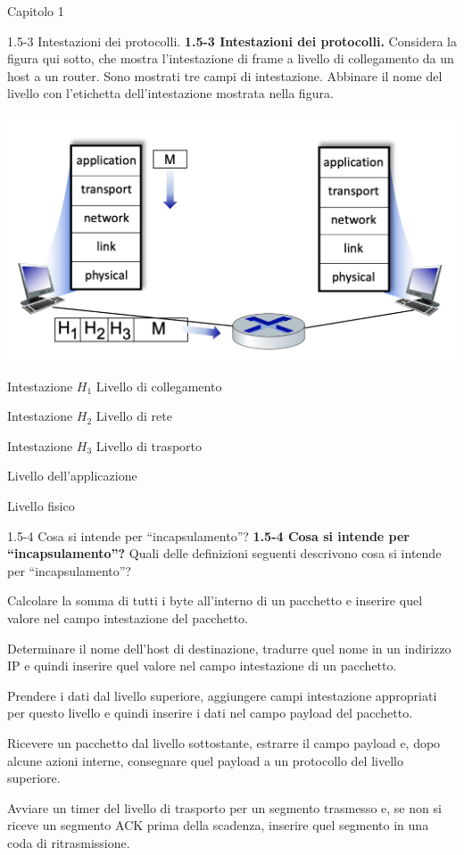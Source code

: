 \documentclass[a4paper]{article}
\begin{document}
\begin{quiz}{Capitolo 1}
\begin{matching}[points=1,shuffle=true]{1.5-3 Intestazioni dei protocolli.}
\textbf{1.5-3 Intestazioni dei protocolli.}
Considera la figura qui sotto, che mostra l'intestazione di frame a livello di collegamento da un host a un router. Sono mostrati tre campi di intestazione. Abbinare il nome del livello con l'etichetta dell'intestazione mostrata nella figura.

\begin{center}
\includegraphics[width=.9\linewidth]{figs/1.5.3.jpg}
\end{center}

\item Intestazione $H_1$ \answer Livello di collegamento
\item Intestazione $H_2$ \answer Livello di rete
\item Intestazione $H_3$ \answer Livello di trasporto
\item \answer Livello dell'applicazione
\item \answer Livello fisico
\end{matching}

\begin{multi}[points=1,shuffle=true]{1.5-4 Cosa si intende per ``incapsulamento''?}
\textbf{1.5-4 Cosa si intende per ``incapsulamento''?} 
Quali delle definizioni seguenti descrivono cosa si intende per ``incapsulamento''?
\item Calcolare la somma di tutti i byte all'interno di un pacchetto e inserire quel valore nel campo intestazione del pacchetto.
\item Determinare il nome dell'host di destinazione, tradurre quel nome in un indirizzo IP e quindi inserire quel valore nel campo intestazione di un pacchetto.
\item* Prendere i dati dal livello superiore, aggiungere campi intestazione appropriati per questo livello e quindi inserire i dati nel campo payload del pacchetto.
\item Ricevere un pacchetto dal livello sottostante, estrarre il campo payload e, dopo alcune azioni interne, consegnare quel payload a un protocollo del livello superiore.
\item Avviare un timer del livello di trasporto per un segmento trasmesso e, se non si riceve un segmento ACK prima della scadenza, inserire quel segmento in una coda di ritrasmissione.
\end{multi}



\end{quiz}
\end{document}
